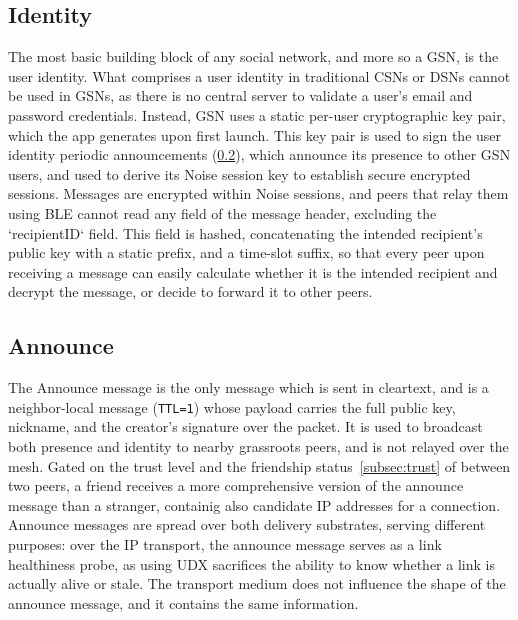 \subsection{Identity}
\label{subsec:identity}
The most basic building block of any social network, and more so a GSN, is the user identity.
What comprises a user identity in traditional CSNs or DSNs cannot be used in GSNs, as there is no central server to validate a user's email and password credentials.
Instead, GSN uses a static per-user cryptographic key pair, which the app generates upon first launch.
This key pair is used to sign the user identity periodic announcements (\ref{subsec:announce}), which announce its presence to other GSN users, and used to derive its Noise session key to establish secure encrypted sessions.
Messages are encrypted within Noise sessions, and peers that relay them using BLE cannot read any field of the message header, excluding the `recipientID` field. This field is hashed, concatenating the intended recipient's public key with a static prefix, and a time-slot suffix, so that every peer upon receiving a message can easily calculate whether it is the intended recipient and decrypt the message, or decide to forward it to other peers.

\subsection{Announce}
\label{subsec:announce}
The Announce message is the only message which is sent in cleartext, and is a neighbor-local message (\verb|TTL=1|) whose payload carries the full public key, nickname, and the creator's signature over the packet.
It is used to broadcast both presence and identity to nearby grassroots peers, and is not relayed over the mesh. Gated on the trust level and the friendship status~\ref{subsec:trust} of between two peers, a friend receives a more comprehensive version of the announce message than a stranger, containig also candidate IP addresses for a connection.
Announce messages are spread over both delivery substrates, serving different purposes: over the IP transport, the announce message serves as a link healthiness probe, as using UDX sacrifices the ability to know whether a link is actually alive or stale. The transport medium does not influence the shape of the announce message, and it contains the same information.

